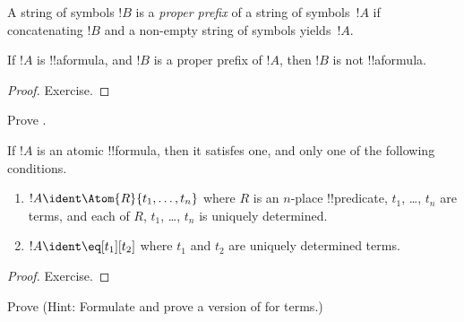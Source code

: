 \documentclass[../../../include/open-logic-section]{subfiles}
\begin{document}
\begin{defn}
A string of symbols $!B$ is a \emph{proper prefix} of a string of symbols~$!A$ if
concatenating $!B$ and a non-empty string of symbols yields~$!A$.
\end{defn}

\begin{lem}
If $!A$ is !!a{formula}, and $!B$ is a proper prefix of $!A$, then
$!B$ is not !!a{formula}.
\end{lem}

\begin{proof}
Exercise.
\end{proof}

\begin{prob}
Prove .
\end{prob}

\begin{prop}
If $!A$ is an atomic !!{formula}, then it satisfes one, and only one
of the following conditions.
\begin{enumerate}
\item $!A \ident \Atom{R}{t_1,\dots,t_n}$ where $R$ is an $n$-place
  !!{predicate}, $t_1$, \dots, $t_n$ are terms, and each of $R$,
  $t_1$, \dots, $t_n$ is uniquely determined.
\item $!A \ident \eq[t_1][t_2]$ where $t_1$ and $t_2$ are uniquely
  determined terms.
\end{enumerate}
\end{prop}

\begin{proof}
Exercise.
\end{proof}

\begin{prob}
Prove  (Hint: Formulate and
prove a version of  for terms.)
\end{prob}
\end{document}
